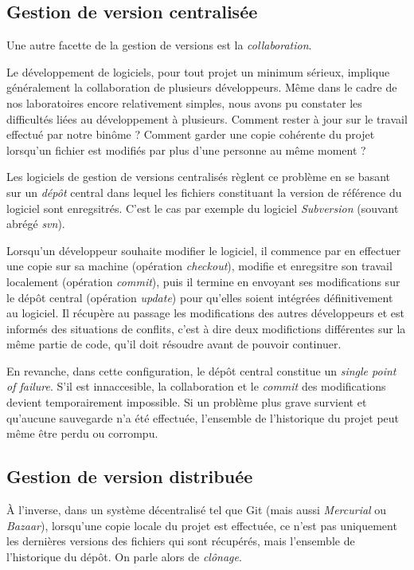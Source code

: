 \documentclass[11pt,a4paper]{article}
\begin{document}
\subsection{Gestion de version centralisée}

Une autre facette de la gestion de versions est la \textit{collaboration}. 

Le développement de logiciels, pour tout projet un minimum sérieux, implique généralement la collaboration de plusieurs développeurs. Même dans le cadre de nos laboratoires encore relativement simples, nous avons pu constater les difficultés liées au développement à plusieurs. Comment rester à jour sur le travail effectué par notre binôme ? Comment garder une copie cohérente du projet lorsqu'un fichier est modifiés par plus d'une personne au même moment ?

Les logiciels de gestion de versions centralisés règlent ce problème en se basant sur un \textit{dépôt} central dans lequel les fichiers constituant la version de référence du logiciel sont enregsitrés. C'est le cas par exemple du logiciel \textit{Subversion} (souvant abrégé \textit{svn}).

Lorsqu'un développeur souhaite modifier le logiciel, il commence par en effectuer une copie sur sa machine (opération \textit{checkout}), modifie et enregsitre son travail localement (opération \textit{commit}), puis il termine en envoyant ses modifications sur le dépôt central (opération \textit{update}) pour qu'elles soient intégrées définitivement au logiciel. Il récupère au passage les modifications des autres développeurs et est informés des situations de conflits, c'est à dire deux modifictions différentes sur la même partie de code, qu'il doit résoudre avant de pouvoir continuer.

En revanche, dans cette configuration, le dépôt central constitue un \textit{single point of failure}. S'il est innaccesible, la collaboration et le \textit{commit} des modifications devient temporairement impossible. Si un problème plus grave survient et qu'aucune sauvegarde n'a été effectuée, l'ensemble de l'historique du projet peut même être perdu ou corrompu.

\subsection{Gestion de version distribuée}

À l'inverse, dans un système décentralisé tel que Git (mais aussi \textit{Mercurial} ou \textit{Bazaar}), lorsqu'une copie locale du projet est effectuée, ce n'est pas uniquement les dernières versions des fichiers qui sont récupérés, mais l'ensemble de l'historique du dépôt. On parle alors de \textit{clônage}.
\end{document}
